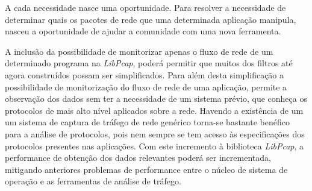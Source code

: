 
A cada necessidade nasce uma oportunidade.
Para resolver a necessidade de determinar quais os pacotes de rede que uma determinada aplicação manipula, nasceu a oportunidade de ajudar a comunidade com uma nova ferramenta.

A inclusão da possibilidade de monitorizar apenas o fluxo de rede de um determinado programa na \textit{LibPcap}, poderá permitir que muitos dos filtros até agora construídos possam ser simplificados.
Para além desta simplificação a possibilidade de monitorização do fluxo de rede de uma aplicação, permite a observação dos dados sem ter a necessidade de um sistema prévio, que conheça os protocolos de mais alto nível aplicados sobre a rede.
Havendo a existência de um um sistema de captura de tráfego de rede genérico torna-se bastante benéfico para a análise de protocolos, pois nem sempre se tem acesso às especificações dos protocolos presentes nas aplicações.
Com este incremento à biblioteca \textit{LibPcap}, a performance de obtenção dos dados relevantes poderá ser incrementada, mitigando anteriores problemas de performance entre o núcleo de sistema de operação e as ferramentas de análise de tráfego.

